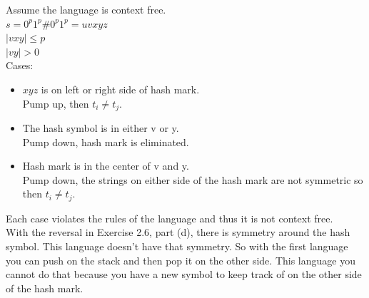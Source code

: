 \begin{problem}{8}
\begin{solution}
    Assume the language is context free. \\
    $s = 0^p1^p\#0^p1^p = uvxyz$ \\
    $|vxy| \le p$ \\
    $|vy| > 0$ \\
    Cases:
    \begin{itemize}
      \item $xyz$ is on left or right side of hash mark. \\
        Pump up, then $t_i \ne t_j$.
      \item The hash symbol is in either v or y. \\
        Pump down, hash mark is eliminated.
      \item Hash mark is in the center of v and y. \\
        Pump down, the strings on either side of the hash mark are not symmetric so then $t_i \ne t_j$.
    \end{itemize}
    Each case violates the rules of the language and thus it is not context free. \\
    With the reversal in Exercise 2.6, part (d), there is symmetry around the hash symbol. This language doesn't have
    that symmetry. So with the first language you can push on the stack and then pop it on the other side. This language
    you cannot do that because you have a new symbol to keep track of on the other side of the hash mark.
  \end{solution}
\end{problem}


